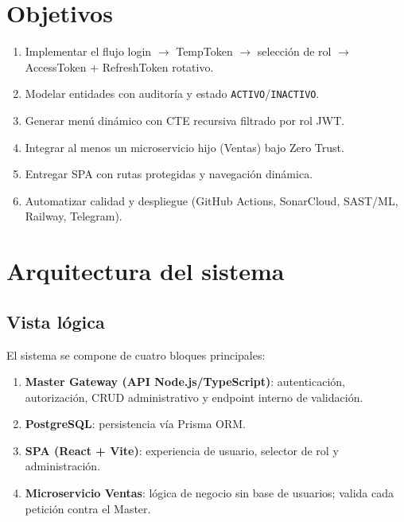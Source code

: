 \documentclass[12pt,a4paper]{article}
\begin{document}
\section{Objetivos}
\begin{enumerate}[leftmargin=1.5em]
  \item Implementar el flujo login $\rightarrow$ TempToken $\rightarrow$ selección de rol
        $\rightarrow$ AccessToken + RefreshToken rotativo.
  \item Modelar entidades con auditoría y estado \texttt{ACTIVO}/\texttt{INACTIVO}.
  \item Generar menú dinámico con CTE recursiva filtrado por rol JWT.
  \item Integrar al menos un microservicio hijo (Ventas) bajo Zero Trust.
  \item Entregar SPA con rutas protegidas y navegación dinámica.
  \item Automatizar calidad y despliegue (GitHub Actions, SonarCloud, SAST/ML, Railway, Telegram).
\end{enumerate}

\section{Arquitectura del sistema}
\subsection{Vista lógica}
El sistema se compone de cuatro bloques principales:

\begin{enumerate}[leftmargin=1.5em]
  \item \textbf{Master Gateway (API Node.js/TypeScript)}: autenticación,
        autorización, CRUD administrativo y endpoint interno de validación.
  \item \textbf{PostgreSQL}: persistencia vía Prisma ORM.
  \item \textbf{SPA (React + Vite)}: experiencia de usuario, selector de rol y
        administración.
  \item \textbf{Microservicio Ventas}: lógica de negocio sin base de usuarios;
        valida cada petición contra el Master.
\end{enumerate}
\end{document}
